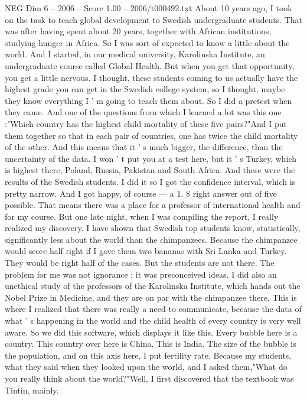\begin{textsample}{NEG Dim 6 – 2006 – Score 1.00 – 2006/t000492.txt}  \label{ex:f6_neg_071}
About 10 years ago, I took on the task to teach global development to Swedish undergraduate students.
That was after having spent about 20 years, together with African institutions, studying hunger in Africa.
So I was sort of expected to know a little about the world.
And I started, in our medical university, Karolinska Institute, an undergraduate course called Global Health.
But when you get that opportunity, you get a little nervous.
I thought, these students coming to us actually have the highest grade you can get in the Swedish college system, so I thought, maybe they know everything I ' m going to teach them about.
So I did a pretest when they came.
And one of the questions from which I learned a lot was this one :"Which country has the highest child mortality of these five pairs?"And I put them together so that in each pair of countries, one has twice the child mortality of the other.
And this means that it ' s much bigger, the difference, than the uncertainty of the data.
I won ' t put you at a test here, but it ' s Turkey, which is highest there, Poland, Russia, Pakistan and South Africa.
And these were the results of the Swedish students.
I did it so I got the confidence interval, which is pretty narrow.
And I got happy, of course — a 1. 8 right answer out of five possible.
That means there was a place for a professor of international health and for my course.
But one late night, when I was compiling the report, I really realized my discovery.
I have shown that Swedish top students know, statistically, significantly less about the world than the chimpanzees.
Because the chimpanzee would score half right if I gave them two bananas with Sri Lanka and Turkey.
They would be right half of the cases.
But the students are not there.
The problem for me was not ignorance ; it was preconceived ideas.
I did also an unethical study of the professors of the Karolinska Institute, which hands out the Nobel Prize in Medicine, and they are on par with the chimpanzee there.
This is where I realized that there was really a need to communicate, because the data of what ' s happening in the world and the child health of every country is very well aware.
So we did this software, which displays it like this.
Every bubble here is a country.
This country over here is China.
This is India.
The size of the bubble is the population, and on this axis here, I put fertility rate.
Because my students, what they said when they looked upon the world, and I asked them,"What do you really think about the world?"Well, I first discovered that the textbook was Tintin, mainly.

\end{textsample}
